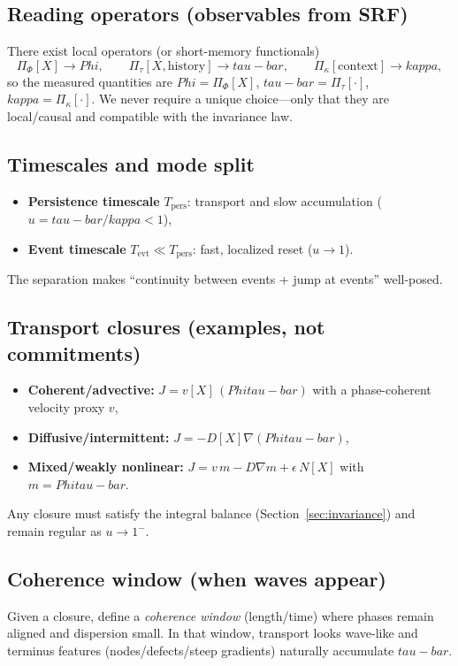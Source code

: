 \documentclass[12pt]{article}
\newcommand{\FoldDensity}{\Phi}
\newcommand{\FoldTime}{\bar{\tau}}
\newcommand{\Threshold}{\kappa}
\def\FoldDensity{Phi}%
\def\FoldTime{tau-bar}%
\def\Threshold{kappa}%
\def\bar#1{#1}%
\def\mathcal#1{#1}%
\begin{document}
\subsection{Reading operators (observables from SRF)}
There exist local operators (or short-memory functionals)
\[
\Pi_\Phi[X] \to \FoldDensity,\qquad
\Pi_{\bar{\tau}}[X,\text{history}] \to \FoldTime,\qquad
\Pi_\kappa[\text{context}] \to \Threshold,
\]
so the measured quantities are $\FoldDensity=\Pi_\Phi[X]$, $\FoldTime=\Pi_{\bar{\tau}}[\cdot]$, $\Threshold=\Pi_\kappa[\cdot]$.
We never require a unique choice—only that they are local/causal and compatible with the invariance law.

\subsection{Timescales and mode split}
\begin{itemize}
  \item \textbf{Persistence timescale} $T_{\text{pers}}$: transport and slow accumulation ($u=\FoldTime/\Threshold<1$),
  \item \textbf{Event timescale} $T_{\text{evt}}\ll T_{\text{pers}}$: fast, localized reset ($u\to 1$).
\end{itemize}
The separation makes ``continuity between events + jump at events'' well-posed.

\subsection{Transport closures (examples, not commitments)}
\begin{itemize}
  \item \textbf{Coherent/advective:} $J = v[X]\,(\FoldDensity\FoldTime)$ with a phase-coherent velocity proxy $v$,
  \item \textbf{Diffusive/intermittent:} $J = -D[X]\nabla(\FoldDensity\FoldTime)$,
  \item \textbf{Mixed/weakly nonlinear:} $J = v\,m - D\nabla m + \epsilon\,\mathcal{N}[X]$ with $m=\FoldDensity\FoldTime$.
\end{itemize}
Any closure must satisfy the integral balance (Section~\ref{sec:invariance}) and remain regular as $u\to 1^{-}$.

\subsection{Coherence window (when waves appear)}
Given a closure, define a \emph{coherence window} (length/time) where phases remain aligned and dispersion small.
In that window, transport looks wave-like and terminus features (nodes/defects/steep gradients) naturally accumulate $\FoldTime$.
\end{document}
